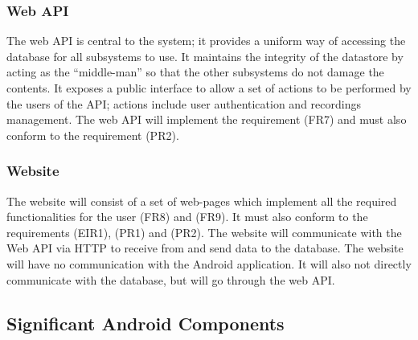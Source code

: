 	\subsubsection{Web API}
		The web API is central to the system; it provides a uniform way of accessing the database for all subsystems to use. It maintains the integrity of the datastore by acting as the ``middle-man'' so that the other subsystems do not damage the contents. It exposes a public interface to allow a set of actions to be performed by the users of the API; actions include user authentication and recordings management. The web API will implement the requirement (FR7) and must also conform to the requirement (PR2).

	\subsubsection{Website}
		The website will consist of a set of web-pages which implement all the required functionalities for the user (FR8) and (FR9). It must also conform to the requirements (EIR1), (PR1) and (PR2). The website will communicate with the Web API via HTTP to receive from and send data to the database. The website will have no communication with the Android application. It will also not directly communicate with the database, but will go through the web API. 


\subsection{Significant Android Components}


